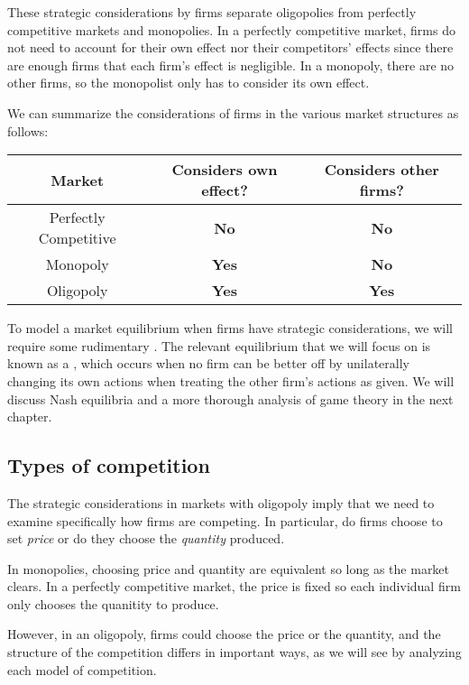 These strategic considerations by firms separate oligopolies from perfectly competitive markets and monopolies. In a perfectly competitive market, firms do not need to account for their own effect nor their competitors' effects since there are enough firms that each firm's effect is negligible. In a monopoly, there are no other firms, so the monopolist only has to consider its own effect.

We can summarize the considerations of firms in the various market structures as follows:

\begin{center}
\begin{tabular}{c | c  | c}
    Market & Considers own effect? & Considers other firms? \\
    \hline
    Perfectly Competitive & \textbf{No} & \textbf{No} \\
    Monopoly & \textbf{Yes} & \textbf{No} \\
    Oligopoly & \textbf{Yes} & \textbf{Yes}
\end{tabular}
\end{center}

To model a market equilibrium when firms have strategic considerations, we will require some rudimentary . The relevant equilibrium that we will focus on is known as a , which occurs when no firm can be better off by unilaterally changing its own actions when treating the other firm's actions as given. We will discuss Nash equilibria and a more thorough analysis of game theory in the next chapter. 


\subsection*{Types of competition}
The strategic considerations in markets with oligopoly imply that we need to examine specifically how firms are competing. In particular, do firms choose to set \emph{price} or do they choose the \emph{quantity} produced. 

In monopolies, choosing price and quantity are equivalent so long as the market clears. In a perfectly competitive market, the price is fixed so each individual firm only chooses the quanitity to produce.

However, in an oligopoly, firms could choose the price or the quantity, and the structure of the competition differs in important ways, as we will see by analyzing each model of competition.